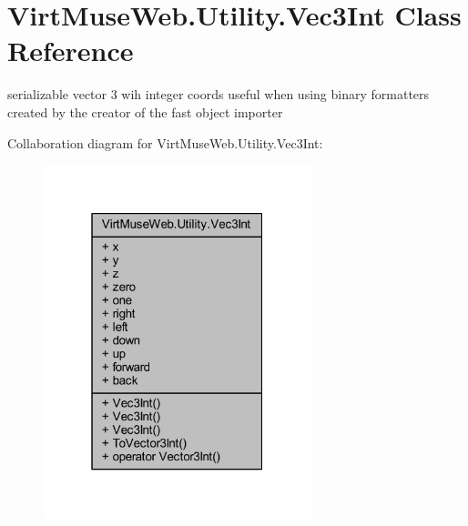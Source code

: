 \hypertarget{class_virt_muse_web_1_1_utility_1_1_vec3_int}{}\section{Virt\+Muse\+Web.\+Utility.\+Vec3\+Int Class Reference}
\label{class_virt_muse_web_1_1_utility_1_1_vec3_int}


serializable vector 3 wih integer coords useful when using binary formatters created by the creator of the fast object importer  




Collaboration diagram for Virt\+Muse\+Web.\+Utility.\+Vec3\+Int\+:
\nopagebreak
\begin{figure}[H]
\begin{center}
\leavevmode
\includegraphics[width=220pt]{class_virt_muse_web_1_1_utility_1_1_vec3_int__coll__graph}
\end{center}
\end{figure}

